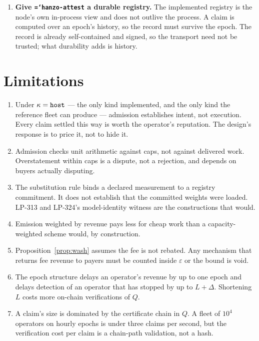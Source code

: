 \documentclass[11pt,a4paper]{article}
\newcommand{\code}[1]{\texttt{\hyphenchar\font=`\-\relax #1}}
\begin{document}
\begin{enumerate}[leftmargin=1.8em]
  \item \textbf{Give \code{hanzo-attest} a durable registry.} The implemented
    registry is the node's own in-process view and does not outlive the process.
    A claim is computed over an epoch's history, so the record must survive the
    epoch. The record is already self-contained and signed, so the transport need
    not be trusted; what durability adds is history.
\end{enumerate}

\section{Limitations}

\begin{enumerate}[leftmargin=1.8em]
  \item Under $\kappa = \code{host}$ --- the only kind implemented, and the only
    kind the reference fleet can produce --- admission establishes intent, not
    execution. Every claim settled this way is worth the operator's reputation.
    The design's response is to price it, not to hide it.
  \item Admission checks unit arithmetic against caps, not against delivered
    work. Overstatement within caps is a dispute, not a rejection, and depends on
    buyers actually disputing.
  \item The substitution rule binds a declared measurement to a registry
    commitment. It does not establish that the committed weights were loaded.
    LP-313 and LP-324's model-identity witness are the constructions that would.
  \item Emission weighted by revenue pays less for cheap work than a
    capacity-weighted scheme would, by construction.
  \item Proposition~\ref{prop:wash} assumes the fee is not rebated. Any mechanism
    that returns fee revenue to payers must be counted inside $\varepsilon$ or
    the bound is void.
  \item The epoch structure delays an operator's revenue by up to one epoch and
    delays detection of an operator that has stopped by up to $L + \Delta$.
    Shortening $L$ costs more on-chain verifications of $Q$.
  \item A claim's size is dominated by the certificate chain in $Q$. A fleet of
    $10^4$ operators on hourly epochs is under three claims per second, but the
    verification cost per claim is a chain-path validation, not a hash.
\end{enumerate}
\end{document}
